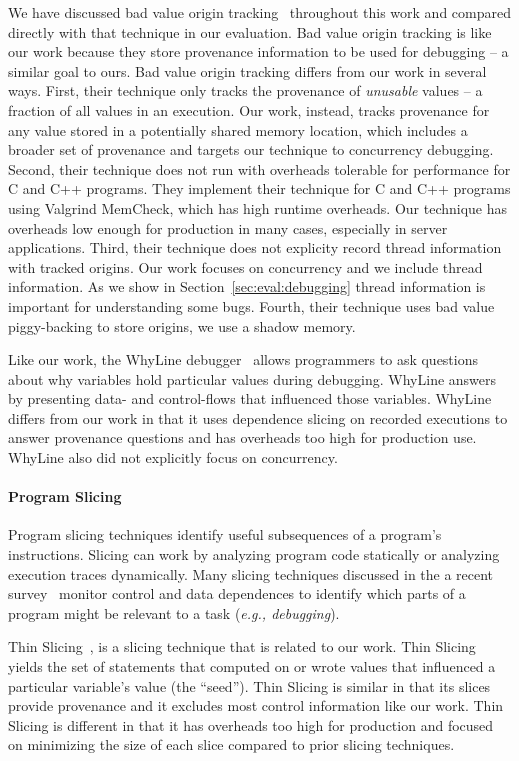 \documentclass[preprint,9pt]{sigplanconf}
\begin{document}
We have discussed bad value origin tracking~\cite{badapples} throughout this
work and compared directly with that technique in our evaluation.  Bad value
origin tracking is like our work because they store provenance information to
be used for debugging -- a similar goal to ours.  Bad value origin tracking
differs from our work in several ways.  First, their technique only tracks the
provenance of {\em unusable} values -- a fraction of all values in an
execution.  Our work, instead, tracks provenance for any value stored in a
potentially shared memory location, which includes a broader set of provenance
and targets our technique to concurrency debugging.  Second, their technique
does not run with overheads tolerable for performance for C and C++ programs.
They implement their technique for C and C++ programs using Valgrind MemCheck,
which has high runtime overheads.  Our technique has overheads low enough for
production in many cases, especially in server applications.  Third, their
technique does not explicity record thread information with tracked origins.
Our work focuses on concurrency and we include thread information.  As we show
in Section~\ref{sec:eval:debugging} thread information is important for
understanding some bugs.  Fourth, their technique uses bad value piggy-backing
to store origins, we use a shadow memory.

Like our work, the WhyLine debugger~\cite{whylineicse, whylinechi} allows
programmers to ask questions about why variables hold particular values during
debugging.  WhyLine answers by presenting data- and control-flows that
influenced those variables.  WhyLine differs from our work in that it uses
dependence slicing on recorded executions to answer provenance questions and
has overheads too high for production use.  WhyLine also did not explicitly
focus on concurrency.


\paragraph{Program Slicing}
Program slicing techniques identify useful subsequences of a program's
instructions.   Slicing can work by analyzing program code statically or
analyzing execution traces dynamically.  Many slicing techniques discussed in
the a recent survey~\cite{tipslicingsurvey} monitor control and data
dependences to identify which parts of a program might be relevant to a task
({\em e.g., debugging}).

Thin Slicing~\cite{thinslicing}, is a slicing technique that is related to our
work.  Thin Slicing yields the set of statements that computed on or wrote
values that influenced a particular variable's value (the ``seed'').  Thin
Slicing is similar in that its slices provide provenance and it excludes
most control information like our work.  Thin Slicing is different in that it has
overheads too high for production and focused on minimizing the size 
of each slice compared to prior slicing techniques. 
\end{document}
